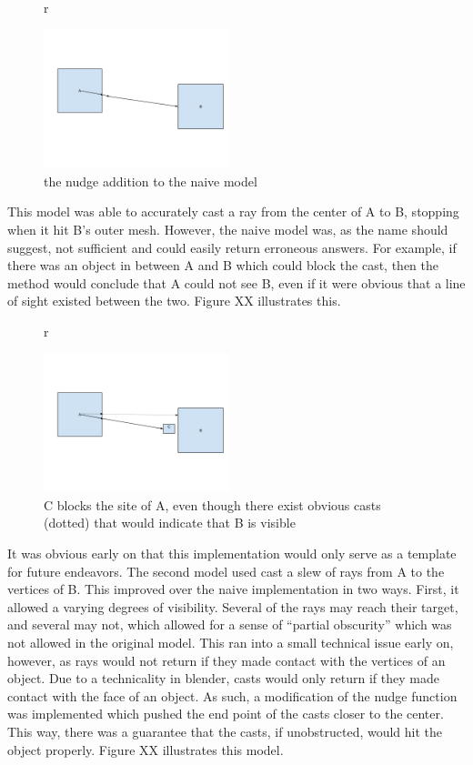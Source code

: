 \begin{figure}{r}
	\begin{center}
		\includegraphics[width=0.48\textwidth]{figures/vision3.png}
	\end{center}
	\caption{the nudge addition to the naive model}
\end{figure}

This model was able to accurately cast a ray from the center of A to B, stopping when it hit B's outer mesh. However, the naive model was, as the name should suggest, not sufficient and could easily return erroneous answers. For example, if there was an object in between A and B which could block the cast, then the method would conclude that A could not see B, even if it were obvious that a line of sight existed between the two. Figure XX illustrates this.

\begin{figure}{r}
	\begin{center}
		\includegraphics[width=0.48\textwidth]{figures/vision4.png}
	\end{center}
	\caption{C blocks the site of A, even though there exist obvious casts (dotted) that would indicate that B is visible}
\end{figure}

It was obvious early on that this implementation would only serve as a template for future endeavors.
The second model used cast a slew of rays from A to the vertices of B. This improved over the naive implementation in two ways. First, it allowed a varying degrees of visibility. Several of the rays may reach their target, and several may not, which allowed for a sense of “partial obscurity” which was not allowed in the original model. This ran into a small technical issue early on, however, as rays would not return if they made contact with the vertices of an object. Due to a technicality in blender, casts would only return if they made contact with the face of an object. As such, a modification of the nudge function was implemented which pushed the end point of the casts closer to the center. This way, there was a guarantee that the casts, if unobstructed, would hit the object properly. Figure XX illustrates this model.


